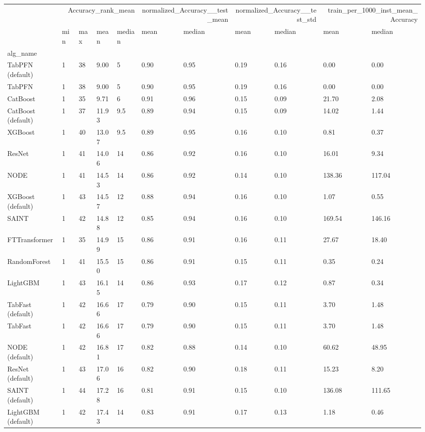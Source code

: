 \begin{tabular}{lllllllllll}
\toprule
 & \multicolumn{4}{r}{Accuracy_rank_mean} & \multicolumn{2}{r}{normalized_Accuracy__test_mean} & \multicolumn{2}{r}{normalized_Accuracy__test_std} & \multicolumn{2}{r}{train_per_1000_inst_mean_Accuracy} \\
 & min & max & mean & median & mean & median & mean & median & mean & median \\
alg_name &  &  &  &  &  &  &  &  &  &  \\
\midrule
TabPFN (default) & 1 & 38 & 9.00 & 5 & 0.90 & 0.95 & 0.19 & 0.16 & 0.00 & 0.00 \\
TabPFN & 1 & 38 & 9.00 & 5 & 0.90 & 0.95 & 0.19 & 0.16 & 0.00 & 0.00 \\
CatBoost & 1 & 35 & 9.71 & 6 & 0.91 & 0.96 & 0.15 & 0.09 & 21.70 & 2.08 \\
CatBoost (default) & 1 & 37 & 11.93 & 9.5 & 0.89 & 0.94 & 0.15 & 0.09 & 14.02 & 1.44 \\
XGBoost & 1 & 40 & 13.07 & 9.5 & 0.89 & 0.95 & 0.16 & 0.10 & 0.81 & 0.37 \\
ResNet & 1 & 41 & 14.06 & 14 & 0.86 & 0.92 & 0.16 & 0.10 & 16.01 & 9.34 \\
NODE & 1 & 41 & 14.53 & 14 & 0.86 & 0.92 & 0.14 & 0.10 & 138.36 & 117.04 \\
XGBoost (default) & 1 & 43 & 14.57 & 12 & 0.88 & 0.94 & 0.16 & 0.10 & 1.07 & 0.55 \\
SAINT & 1 & 42 & 14.88 & 12 & 0.85 & 0.94 & 0.16 & 0.10 & 169.54 & 146.16 \\
FTTransformer & 1 & 35 & 14.99 & 15 & 0.86 & 0.91 & 0.16 & 0.11 & 27.67 & 18.40 \\
RandomForest & 1 & 41 & 15.50 & 15 & 0.86 & 0.91 & 0.15 & 0.11 & 0.35 & 0.24 \\
LightGBM & 1 & 43 & 16.15 & 14 & 0.86 & 0.93 & 0.17 & 0.12 & 0.87 & 0.34 \\
TabFast (default) & 1 & 42 & 16.66 & 17 & 0.79 & 0.90 & 0.15 & 0.11 & 3.70 & 1.48 \\
TabFast & 1 & 42 & 16.66 & 17 & 0.79 & 0.90 & 0.15 & 0.11 & 3.70 & 1.48 \\
NODE (default) & 1 & 42 & 16.81 & 17 & 0.82 & 0.88 & 0.14 & 0.10 & 60.62 & 48.95 \\
ResNet (default) & 1 & 43 & 17.06 & 16 & 0.82 & 0.90 & 0.18 & 0.11 & 15.23 & 8.20 \\
SAINT (default) & 1 & 44 & 17.28 & 16 & 0.81 & 0.91 & 0.15 & 0.10 & 136.08 & 111.65 \\
LightGBM (default) & 1 & 42 & 17.43 & 14 & 0.83 & 0.91 & 0.17 & 0.13 & 1.18 & 0.46 \\

\end{tabular}
